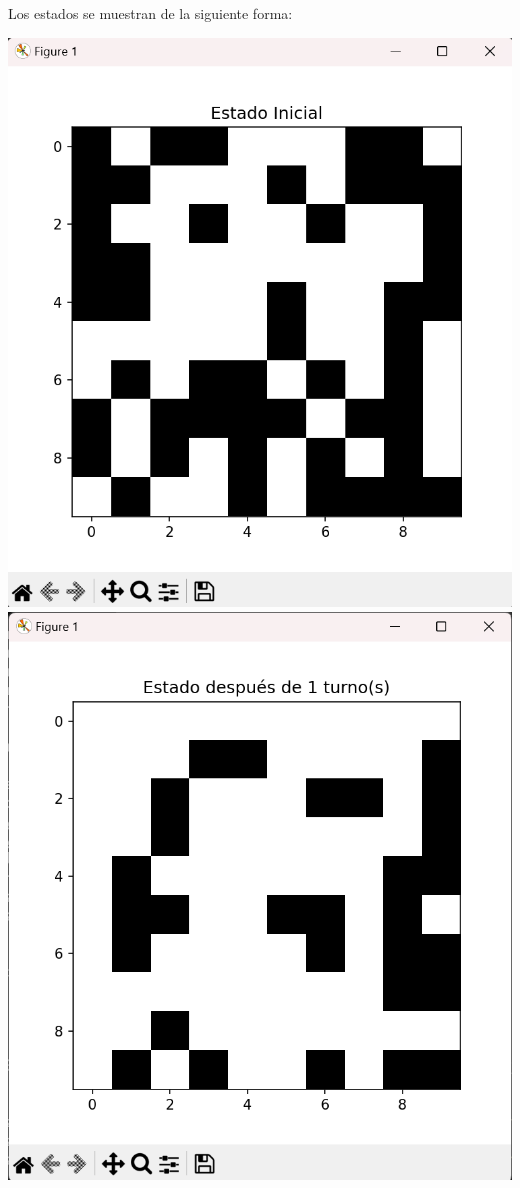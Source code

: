 \begin{enumerate}
\begin{itemize}
Los estados se muestran de la siguiente forma:
\begin{center}
    \includegraphics[scale=0.4]{Practica05/IMA/ejemplosJuegoVida/ejemplo 1.1.png}
    \includegraphics[scale=0.4]{Practica05/IMA/ejemplosJuegoVida/ejemplo 1.2.png}

\end{center}
\end{itemize}
\end{enumerate}
